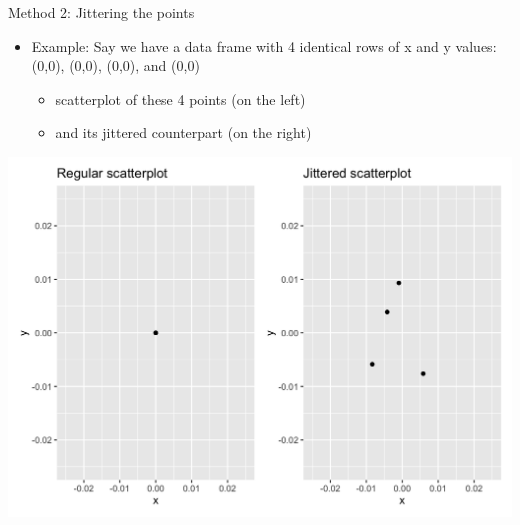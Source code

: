 \documentclass[
  ignorenonframetext,
]{beamer}
\providecommand{\tightlist}{%
  \setlength{\itemsep}{0pt}\setlength{\parskip}{0pt}}
\begin{document}
\begin{frame}{Method 2: Jittering the points}
\protect\hypertarget{method-2-jittering-the-points-1}{}
\begin{itemize}
\item
  Example: Say we have a data frame with 4 identical rows of x and y
  values: (0,0), (0,0), (0,0), and (0,0)

  \begin{itemize}
  \tightlist
  \item
    scatterplot of these 4 points (on the left)
  \item
    and its jittered counterpart (on the right)
  \end{itemize}
\end{itemize}

\tiny

\begin{center}\includegraphics[width=0.7\linewidth,height=0.3\textheight]{Week2_2} \end{center}
\normalsize
\end{frame}
\end{document}
